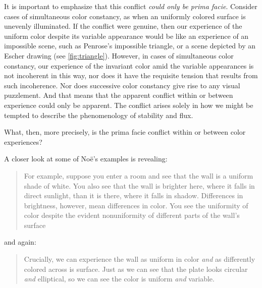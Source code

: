 \documentclass[12pt]{article}
\begin{document}
It is important to emphasize that this conflict \emph{could only be prima facie}. Consider cases of simultaneous color constancy, as when an uniformly colored surface is unevenly illuminated. If the conflict were genuine, then our experience of the uniform color despite its variable appearance would be like an experience of an impossible scene, such as Penrose's \citeyearpar{Penrose:1958kx} impossible triangle, or a scene depicted by an Escher drawing (see \autoref{fig:triangle}).
However, in cases of simultaneous color constancy, our experience of the invariant color amid the variable appearances is not incoherent in this way, nor does it have the requisite tension that results from such incoherence. Nor does successive color constancy give rise to any visual puzzlement. And that means that the apparent conflict within or between experience could only be apparent. The conflict arises solely in how we might be tempted to describe the phenomenology of stability and flux. 

What, then, more precisely, is the prima facie conflict within or between color experiences? 

A closer look at some of Noë's examples is revealing:
	\begin{quote}
		For example, suppose you enter a room and see that the wall is a uniform shade of white. You also see that the wall is brighter here, where it falls in direct sunlight, than it is there, where it falls in shadow. Differences in brightness, however, mean differences in color. You see the uniformity of color despite the evident nonuniformity of different parts of the wall's surface \citep[127]{Noe:2004fk}
	\end{quote}
and again:
	\begin{quote}
		Crucially, we can experience the wall as uniform in color \emph{and} as differently colored across is surface. \citep[129]{Noe:2004fk} Just as we can see that the plate looks circular \emph{and} elliptical, so we can see the color is uniform \emph{and} variable.
	\end{quote}

\end{document}

